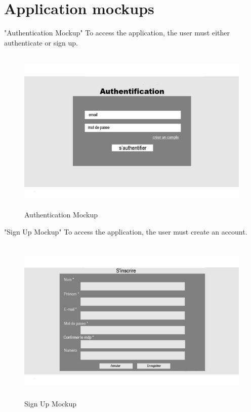 \section{Application mockups   }

"Authentication Mockup" To access the application, the user must either authenticate or sign up. 

\begin{figure}[H]
   \centering
    \includegraphics[width=15cm,height=8cm]{images/maqauth.png}
    \caption{Authentication Mockup} 
    \label{Authentication Mockup}
\end{figure}

"Sign Up Mockup" To access the application, the user must create an account. 

\begin{figure}[H]
   \centering
    \includegraphics[width=15cm,height=8cm]{images/maqinsc.png}
    \caption{Sign Up Mockup} 
    \label{Sign Up Mockup}
\end{figure}




